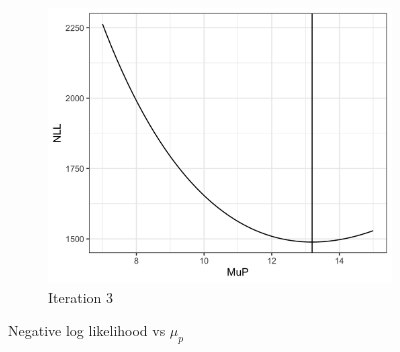 \documentclass[11pt]{article}
\begin{document}
\begin{figure}[H]
\begin{subfigure}[b]{0.45\textwidth}
      \includegraphics[width=\textwidth]{../../../output/figures/Optimization/opt_data_2.png}
      \caption{Iteration 3}

    \end{subfigure}
    \caption{Negative log likelihood vs $\mu_p$}
\end{figure}
\end{document}
